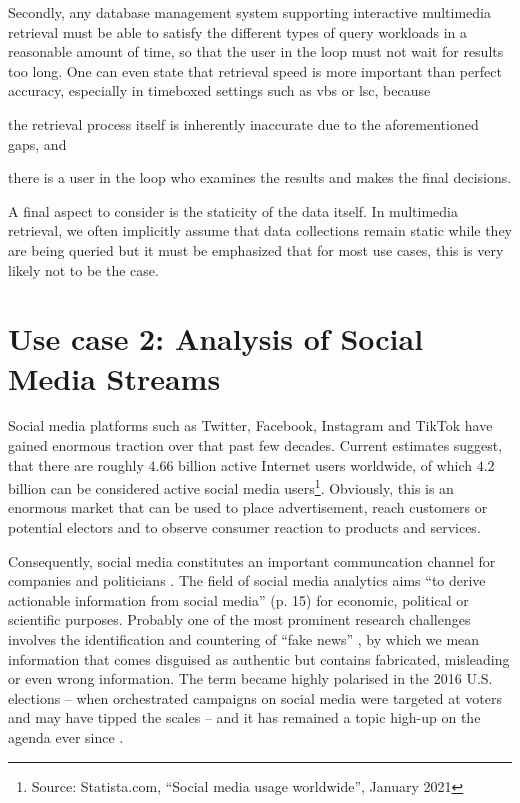 Secondly, any database management system supporting interactive multimedia retrieval must be able to satisfy the different types of query workloads in a reasonable amount of time, so that the user in the loop must not wait for results too long. One can even state that retrieval speed is more important than perfect accuracy, especially in timeboxed settings such as \acrshort{vbs} or \acrshort{lsc}, because
\begin{enumerate*}[label=(\roman*)]
    \item the retrieval process itself is inherently inaccurate due to the aforementioned gaps, and
    \item there is a user in the loop who examines the results and makes the final decisions.
\end{enumerate*}

A final aspect to consider is the staticity of the data itself. In multimedia retrieval, we often implicitly assume that data collections remain static while they are being queried but it must be emphasized that for most use cases, this is very likely not to be the case. 

\section{Use case 2: Analysis of Social Media Streams}
\label{section:application_online_analysis}

Social media platforms such as Twitter, Facebook, Instagram and TikTok have gained enormous traction over that past few decades. Current estimates suggest, that there are roughly $4.66$ billion active Internet users worldwide, of which $4.2$ billion can be considered active social media users\footnote{Source: Statista.com, ``Social media usage worldwide'', January 2021}. Obviously, this is an enormous market that can be used to place advertisement, reach customers or potential electors and to observe consumer reaction to products and services.

Consequently, social media constitutes an important communcation channel for companies and politicians \cite{Barbera:2018New}. The field of social media analytics aims ``to derive actionable information from social media'' \cite{Zheng:2010Social} (p. 15) for economic, political or scientific purposes. Probably one of the most prominent research challenges involves the identification and countering of ``fake news'' \cite{Lazer:2018Science}, by which we mean information that comes disguised as authentic but contains fabricated, misleading or even wrong information. The term became highly polarised in the 2016 U.S. elections \cite{Quandt:2019Fake} -- when orchestrated campaigns on social media were targeted at voters and may have tipped the scales -- and it has remained a topic high-up on the agenda ever since \cite{Ferrara:2020Characterizing}.

